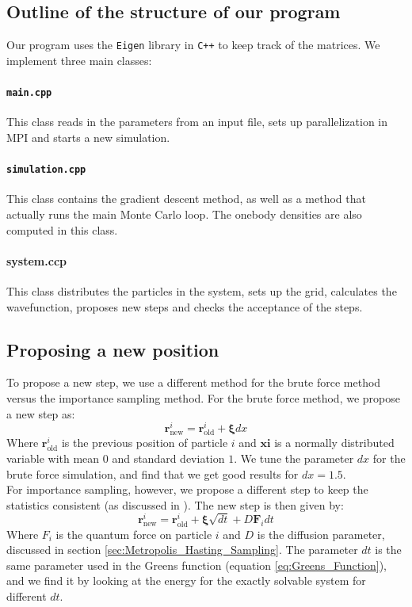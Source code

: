 \documentclass[a4paper, 10pt]{article}
\begin{document}
	\subsection{Outline of the structure of our program}
	Our program uses the \texttt{Eigen} library in \texttt{C++} to keep track of the matrices. We implement three main classes:\\
	\paragraph{\texttt{main.cpp}}
	This class reads in the parameters from an input file, sets up parallelization in MPI and starts a new simulation.\\
	\linebreak
	\paragraph{\texttt{simulation.cpp}}
	This class contains the gradient descent method, as well as a method that actually runs the main Monte Carlo loop. The onebody densities are also computed in this class.\\
	\linebreak
	\paragraph{system.ccp}
	This class distributes the particles in the system, sets up the grid, calculates the wavefunction, proposes new steps and checks the acceptance of the steps. 
	\subsection{Proposing a new position}
	To propose a new step, we use a different method for the brute force method versus the importance sampling method. For the brute force method, we propose a new step as:
	\begin{equation}
	\boldsymbol{r}^i_{\mathrm{new}}=\boldsymbol{r}^i_{\mathrm{old}}+\boldsymbol{\xi} dx
	\end{equation}
	Where $\boldsymbol{r}^i_{\mathrm{old}}$ is the previous position of particle $i$ and $\boldsymbol{xi}$ is a normally distributed variable with mean $0$ and standard deviation $1$. We tune the parameter $dx$ for the brute force simulation, and find that we get good results for $dx=1.5$.\\
	\linebreak
	For importance sampling, however, we propose a different step to keep the statistics consistent (as discussed in \cite{Jonsson2018}). The new step is then given by:
	\begin{equation}
	\boldsymbol{r}^i_{\mathrm{new}}=\boldsymbol{r}^i_{\mathrm{old}}+\boldsymbol{\xi} \sqrt{dt}+D\boldsymbol{F}_idt
	\end{equation}
	Where $F_i$ is the quantum force on particle $i$ and $D$ is the diffusion parameter, discussed in section \ref{sec:Metropolis_Hasting_Sampling}. The parameter $dt$ is the same parameter used in the Greens function (equation \ref{eq:Greens_Function}), and we find it by looking at the energy for the exactly solvable system for different $dt$.
\end{document}
